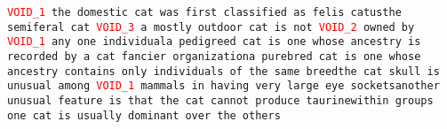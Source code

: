 \texttt{\textcolor{red}{VOID\_1} the domestic cat was first classified as felis catus\newline the semiferal cat \textcolor{red}{VOID\_3} a mostly outdoor cat is not \textcolor{red}{VOID\_2} owned by \textcolor{red}{VOID\_1} any one individual\newline a pedigreed cat is one whose ancestry is recorded by a cat fancier organization\newline a purebred cat is one whose ancestry contains only individuals of the same breed\newline the cat skull is unusual among \textcolor{red}{VOID\_1} mammals in having very large eye sockets\newline another unusual feature is that the cat cannot produce taurine\newline within groups one cat is usually dominant over the others}
